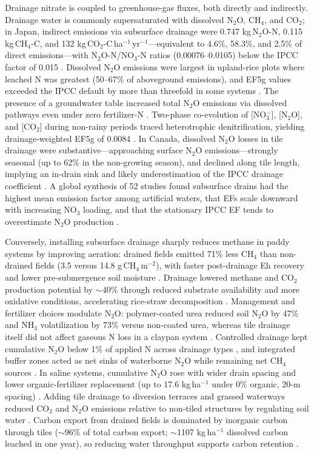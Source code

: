 \documentclass[11pt]{article}
\begin{document}
Drainage nitrate is coupled to greenhouse-gas fluxes, both directly and indirectly. Drainage water is commonly supersaturated with dissolved N$_2$O, CH$_4$, and CO$_2$; in Japan, indirect emissions via subsurface drainage were 0.747 kg\,N$_2$O-N, 0.115 kg\,CH$_4$-C, and 132 kg\,CO$_2$-C\,ha$^{-1}$\,yr$^{-1}$---equivalent to 4.6\%, 58.3\%, and 2.5\% of direct emissions---with N$_2$O-N/NO$_3$-N ratios (0.00076--0.0105) below the IPCC factor of 0.015 \parencite{Sawamoto2003}. Dissolved N$_2$O emissions were largest in upland-rice plots where leached N was greatest (50--67\% of aboveground emissions), and EF5g values exceeded the IPCC default by more than threefold in some systems \parencite{Minamikawa2010}. The presence of a groundwater table increased total N$_2$O emissions via dissolved pathways even under zero fertilizer-N \parencite{Minamikawa2013}. Two-phase co-evolution of [NO$_3^-$], [N$_2$O], and [CO$_2$] during non-rainy periods traced heterotrophic denitrification, yielding drainage-weighted EF5g of 0.0084 \parencite{Minamikawa2015}. In Canada, dissolved N$_2$O losses in tile drainage were substantive---approaching surface N$_2$O emissions---strongly seasonal (up to 62\% in the non-growing season), and declined along tile length, implying an in-drain sink and likely underestimation of the IPCC drainage coefficient \parencite{Burton2024}. A global synthesis of 52 studies found subsurface drains had the highest mean emission factor among artificial waters, that EFs scale downward with increasing NO$_3$ loading, and that the stationary IPCC EF tends to overestimate N$_2$O production \parencite{Webb2021}.

Conversely, installing subsurface drainage sharply reduces methane in paddy systems by improving aeration: drained fields emitted 71\% less CH$_4$ than non-drained fields (3.5 versus 14.8 g\,CH$_4$\,m$^{-2}$), with faster post-drainage Eh recovery and lower pre-submergence soil moisture \parencite{Shiratori2007}. Drainage lowered methane and CO$_2$ production potential by $\sim$40\% through reduced substrate availability and more oxidative conditions, accelerating rice-straw decomposition \parencite{Furukawa2008}. Management and fertilizer choices modulate N$_2$O: polymer-coated urea reduced soil N$_2$O by 47\% and NH$_3$ volatilization by 73\% versus non-coated urea, whereas tile drainage itself did not affect gaseous N loss in a claypan system \parencite{Nash2015e}. Controlled drainage kept cumulative N$_2$O below 1\% of applied N across drainage types \parencite{Smith2019}, and integrated buffer zones acted as net sinks of waterborne N$_2$O while remaining net CH$_4$ sources \parencite{Carstensen2021}. In saline systems, cumulative N$_2$O rose with wider drain spacing and lower organic-fertilizer replacement (up to 17.6 kg\,ha$^{-1}$ under 0\% organic, 20-m spacing) \parencite{Zhai2023}. Adding tile drainage to diversion terraces and grassed waterways reduced CO$_2$ and N$_2$O emissions relative to non-tiled structures by regulating soil water \parencite{Driscoll2025}. Carbon export from drained fields is dominated by inorganic carbon through tiles ($\sim$96\% of total carbon export; $\sim$1107 kg\,ha$^{-1}$ dissolved carbon leached in one year), so reducing water throughput supports carbon retention \parencite{Schilling2023}.
\end{document}

